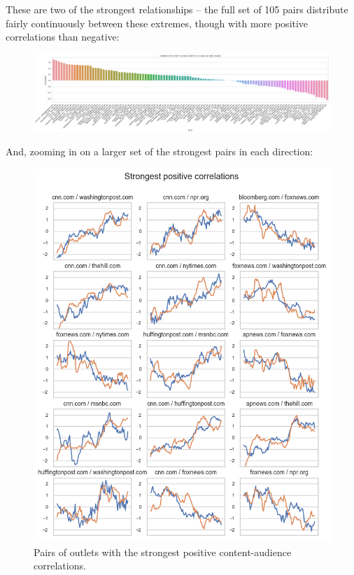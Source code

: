 \documentclass{scrartcl}
\begin{document}
These are two of the strongest relationships -- the full set of 105 pairs distribute fairly continuously between these extremes, though with more positive correlations than negative:

\begin{figure}[H]
  \centering
  \includegraphics[width=\textwidth]{figures/ts-ca-corrs.png}
\end{figure}

And, zooming in on a larger set of the strongest pairs in each direction:

\begin{figure}[H]
  \centering
  \includegraphics[height=0.6\textheight]{figures/ts-ca-pos-corrs.png}
  \caption{Pairs of outlets with the strongest positive content-audience correlations.}
\end{figure}
\end{document}
